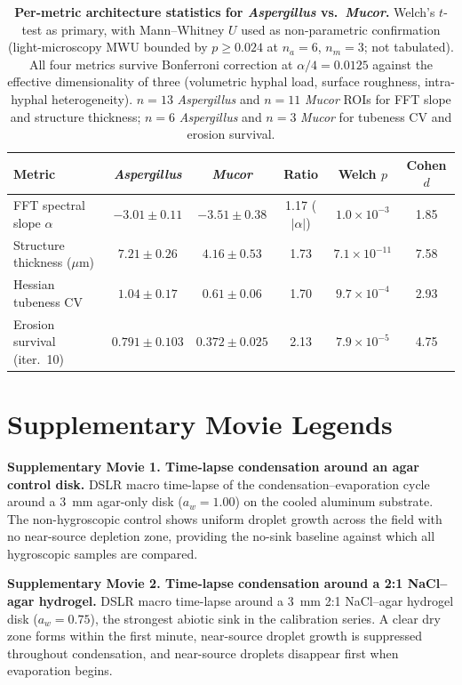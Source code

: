 \documentclass[11pt]{article}
\begin{document}
\clearpage
\begin{table}[H]
\caption{\textbf{Per-metric architecture statistics for \textit{Aspergillus} vs.\ \textit{Mucor}.}
Welch's $t$-test as primary, with Mann--Whitney $U$ used as non-parametric confirmation (light-microscopy MWU bounded by $p \geq 0.024$ at $n_a = 6$, $n_m = 3$; not tabulated). All four metrics survive Bonferroni correction at $\alpha/4 = 0.0125$ against the effective dimensionality of three (volumetric hyphal load, surface roughness, intra-hyphal heterogeneity). $n = 13$ \textit{Aspergillus} and $n = 11$ \textit{Mucor} ROIs for FFT slope and structure thickness; $n = 6$ \textit{Aspergillus} and $n = 3$ \textit{Mucor} for tubeness CV and erosion survival.}
\centering
\begin{tabular}{lccccc}
\toprule
Metric & \textit{Aspergillus} & \textit{Mucor} & Ratio & Welch $p$ & Cohen $d$ \\
\midrule
FFT spectral slope $\alpha$  & $-3.01 \pm 0.11$    & $-3.51 \pm 0.38$    & 1.17 ($|\alpha|$) & $1.0 \times 10^{-3}$  & 1.85 \\
Structure thickness ($\mu$m) & $7.21 \pm 0.26$     & $4.16 \pm 0.53$     & 1.73             & $7.1 \times 10^{-11}$ & 7.58 \\
Hessian tubeness CV          & $1.04 \pm 0.17$     & $0.61 \pm 0.06$     & 1.70             & $9.7 \times 10^{-4}$  & 2.93 \\
Erosion survival (iter.\ 10) & $0.791 \pm 0.103$   & $0.372 \pm 0.025$   & 2.13             & $7.9 \times 10^{-5}$  & 4.75 \\
\bottomrule
\end{tabular}
\end{table}


\clearpage
\section*{Supplementary Movie Legends}

\noindent\textbf{Supplementary Movie 1. Time-lapse condensation around an agar control disk.} DSLR macro time-lapse of the condensation--evaporation cycle around a 3~mm agar-only disk ($a_w = 1.00$) on the cooled aluminum substrate. The non-hygroscopic control shows uniform droplet growth across the field with no near-source depletion zone, providing the no-sink baseline against which all hygroscopic samples are compared.

\vspace{1em}
\noindent\textbf{Supplementary Movie 2. Time-lapse condensation around a 2:1 NaCl--agar hydrogel.} DSLR macro time-lapse around a 3~mm 2:1 NaCl--agar hydrogel disk ($a_w = 0.75$), the strongest abiotic sink in the calibration series. A clear dry zone forms within the first minute, near-source droplet growth is suppressed throughout condensation, and near-source droplets disappear first when evaporation begins.
\end{document}
